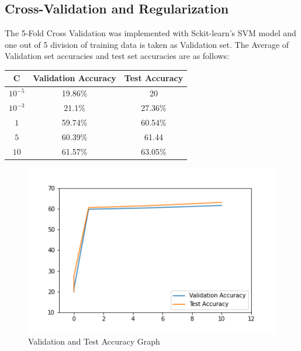 \documentclass[11pt]{article}
\begin{document}
\subsection{Cross-Validation and Regularization}
The 5-Fold Cross Validation was implemented with Sckit-learn's SVM model and one out of 5 division of training data is taken as Validation set. The Average of Validation set accuracies and test set accuracies are as follows:
\begin{center}
\begin{tabular}{c|c|c}
    
    
     C & Validation Accuracy & Test Accuracy  \\
    \hline
    $10^{-5}$ &  19.86\% & 20 \\
    $10^{-3}$ & 21.1\% & 27.36\%\\
    $1$ & 59.74\%& 60.54\% \\
    $5$ & 60.39\%& 61.44\\%
    $10$ & 61.57\% & 63.05\% \\
    
    
\end{tabular}
    
\end{center}
\begin{figure}[H]
    \centering
    \includegraphics[scale=1]{Accplot.png}
    \caption{Validation and Test Accuracy Graph}
\end{figure}
\end{document}
